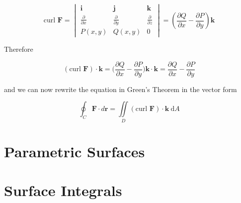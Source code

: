 \documentclass{article}
\begin{document}
\begin{equation*}
    \text{curl } \mathbf{F} = \begin{vmatrix}
        \mathbf{i} & \mathbf{j} & \mathbf{k} \\[6pt]
        \frac{\partial }{\partial x} & \frac{\partial}{\partial y} & \frac{\partial}{\partial z} \\[6pt] 
        P(x,y) & Q(x,y) & 0
    \end{vmatrix} = (\frac{\partial Q}{\partial x} - \frac{\partial P}{\partial y}) \mathbf{k}
\end{equation*}

Therefore

\begin{equation*}
    (\text{curl } \mathbf{F}) \cdot \mathbf{k} = \bigg( \frac{\partial Q}{\partial x} - \frac{\partial P}{\partial y} \bigg) \mathbf{k} \cdot \mathbf{k} = \frac{\partial Q}{\partial x} - \frac{\partial P}{\partial y}
\end{equation*}

and we can now rewrite the equation in Green's Theorem in the vector form 

\begin{equation*}
    \oint_C \mathbf{F} \cdot d \mathbf{r} = \iint\limits_D (\text{curl } \mathbf{F}) \cdot \mathbf{k} \ \mathrm{d} A
\end{equation*}

\newpage
\section{Parametric Surfaces}

\newpage
\section{Surface Integrals}
\end{document}
